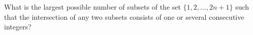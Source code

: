 What is the largest possible number of subsets of the set $\{1, 2, \dots , 2n+1\}$ such that the intersection of any two subsets consists of one or several consecutive integers?